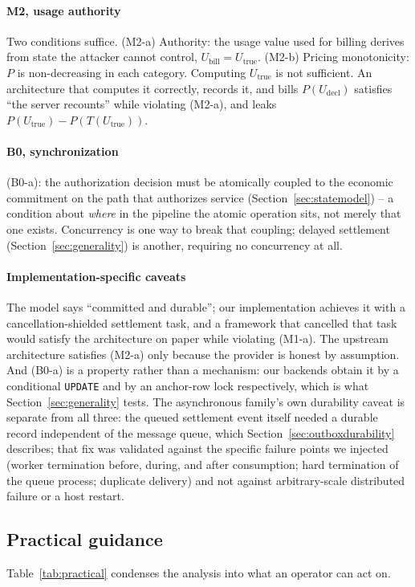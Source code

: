 \documentclass[manuscript,review,anonymous]{acmart}
\begin{document}
\paragraph{M2, usage authority}
Two conditions suffice. (M2-a) Authority: the usage value used for billing derives from
state the attacker cannot control, $U_{\mathrm{bill}} = U_{\mathrm{true}}$. (M2-b)
Pricing monotonicity: $P$ is non-decreasing in each category. Computing $U_{\mathrm{true}}$
is not sufficient. An architecture that computes it correctly, records it, and bills
$P(U_{\mathrm{decl}})$ satisfies ``the server recounts'' while violating (M2-a), and
leaks $P(U_{\mathrm{true}}) - P(T(U_{\mathrm{true}}))$.

\paragraph{B0, synchronization}
(B0-a): the authorization decision must be atomically coupled to the economic commitment
on the path that authorizes service (Section~\ref{sec:statemodel}) -- a condition about
\emph{where} in the pipeline the atomic operation sits, not merely that one exists.
Concurrency is one way to break that coupling; delayed settlement
(Section~\ref{sec:generality}) is another, requiring no concurrency at all.

\paragraph{Implementation-specific caveats}
The model says ``committed and durable''; our implementation achieves it with a
cancellation-shielded settlement task, and a framework that cancelled that task would
satisfy the architecture on paper while violating (M1-a). The upstream architecture
satisfies (M2-a) only because the provider is honest by assumption. And (B0-a) is a
property rather than a mechanism: our backends obtain it by a conditional \texttt{UPDATE}
and by an anchor-row lock respectively, which is what Section~\ref{sec:generality} tests.
The asynchronous family's own durability caveat is separate from all three: the queued
settlement event itself needed a durable record independent of the message queue, which
Section~\ref{sec:outboxdurability} describes; that fix was validated against the specific
failure points we injected (worker termination before, during, and after consumption;
hard termination of the queue process; duplicate delivery) and not against arbitrary-scale
distributed failure or a host restart.

\subsection{Practical guidance}
Table~\ref{tab:practical} condenses the analysis into what an operator can act on.
\end{document}
